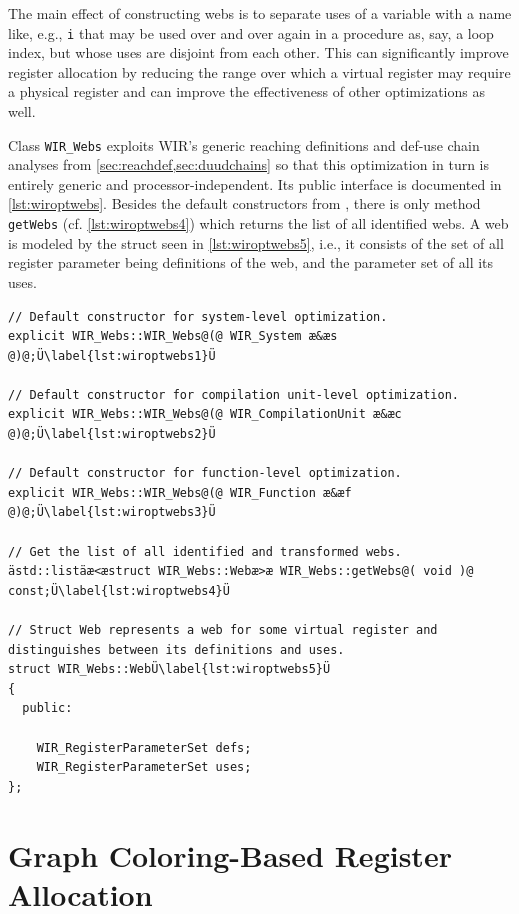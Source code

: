 The main effect of constructing webs is to separate uses of a variable with a name like, e.g., \texttt{i} that may be used over and over again in a procedure as, say, a loop index, but whose uses are disjoint from each other.
This can significantly improve register allocation by reducing the range over which a virtual register may require a physical register and can improve the effectiveness of other optimizations as well.

Class \texttt{WIR\_Webs} exploits \gls{WIR}'s generic reaching definitions and def-use chain analyses from \cref{sec:reachdef,sec:duudchains} so that this optimization in turn is entirely generic and processor-independent.
Its public interface is documented in \cref{lst:wiroptwebs}.
Besides the default constructors from , there is only method \texttt{getWebs} (cf. \cref{lst:wiroptwebs4}) which returns the list of all identified webs.
A web is modeled by the struct seen in \cref{lst:wiroptwebs5}, i.e., it consists of the set of all register parameter being definitions of the web, and the parameter set of all its uses.

\begin{lstlisting}[style=code,float=t,caption={Public Interface of Class \texttt{WIR\_Webs}},label=lst:wiroptwebs]
// Default constructor for system-level optimization.
explicit WIR_Webs::WIR_Webs@(@ WIR_System æ&æs @)@;Ü\label{lst:wiroptwebs1}Ü

// Default constructor for compilation unit-level optimization.
explicit WIR_Webs::WIR_Webs@(@ WIR_CompilationUnit æ&æc @)@;Ü\label{lst:wiroptwebs2}Ü

// Default constructor for function-level optimization.
explicit WIR_Webs::WIR_Webs@(@ WIR_Function æ&æf @)@;Ü\label{lst:wiroptwebs3}Ü

// Get the list of all identified and transformed webs.
ästd::listäæ<æstruct WIR_Webs::Webæ>æ WIR_Webs::getWebs@( void )@ const;Ü\label{lst:wiroptwebs4}Ü

// Struct Web represents a web for some virtual register and distinguishes between its definitions and uses.
struct WIR_Webs::WebÜ\label{lst:wiroptwebs5}Ü
{
  public:

    WIR_RegisterParameterSet defs;
    WIR_RegisterParameterSet uses;
};
\end{lstlisting}


\section{Graph Coloring-Based Register Allocation}
\label{sec:optregalloc}

